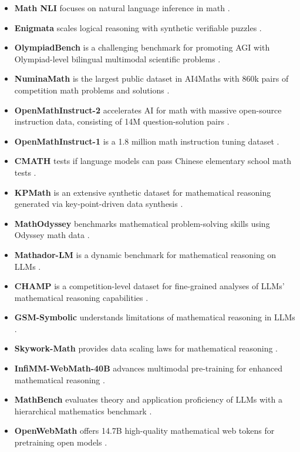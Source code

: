 \documentclass[acmsmall,anonymous]{acmart}
\begin{document}
\begin{itemize}
    \item \textbf{Math NLI} focuses on natural language inference in math \cite{depaiva2025mathnli}.
    \item \textbf{Enigmata} scales logical reasoning with synthetic verifiable puzzles \cite{anonymous2025enigmata}.
    \item \textbf{OlympiadBench} is a challenging benchmark for promoting AGI with Olympiad-level bilingual multimodal scientific problems \cite{he2024bolympiadbench}.
    \item \textbf{NuminaMath} is the largest public dataset in AI4Maths with 860k pairs of competition math problems and solutions \cite{li2024c numinamath}.
    \item \textbf{OpenMathInstruct-2} accelerates AI for math with massive open-source instruction data, consisting of 14M question-solution pairs \cite{toshniwal2024a openmathinstruct2}.
    \item \textbf{OpenMathInstruct-1} is a 1.8 million math instruction tuning dataset \cite{toshniwal2024b openmathinstruct1}.
    \item \textbf{CMATH} tests if language models can pass Chinese elementary school math tests \cite{wei2023cmath}.
    \item \textbf{KPMath} is an extensive synthetic dataset for mathematical reasoning generated via key-point-driven data synthesis \cite{huang2024key}.
    \item \textbf{MathOdyssey} benchmarks mathematical problem-solving skills using Odyssey math data \cite{fang2024}.
    \item \textbf{Mathador-LM} is a dynamic benchmark for mathematical reasoning on LLMs \cite{kurtic2024}.
    \item \textbf{CHAMP} is a competition-level dataset for fine-grained analyses of LLMs' mathematical reasoning capabilities \cite{mao2024}.
    \item \textbf{GSM-Symbolic} understands limitations of mathematical reasoning in LLMs \cite{mirzadeh2024}.
    \item \textbf{Skywork-Math} provides data scaling laws for mathematical reasoning \cite{zeng2024}.
    \item \textbf{InfiMM-WebMath-40B} advances multimodal pre-training for enhanced mathematical reasoning \cite{han2024}.
    \item \textbf{MathBench} evaluates theory and application proficiency of LLMs with a hierarchical mathematics benchmark \cite{liu2024b}.
    \item \textbf{OpenWebMath} offers 14.7B high-quality mathematical web tokens for pretraining open models \cite{paster-2023-openwebmath}.

\end{itemize}
\end{document}
